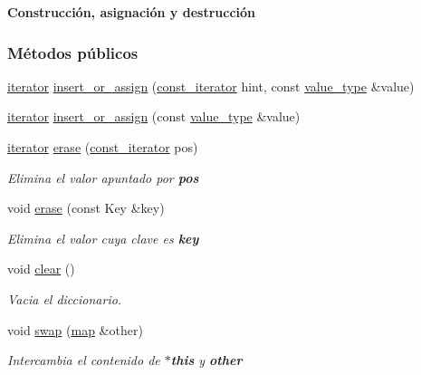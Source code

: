 \begin{Indent}{\bf \-Construcción, asignación y destrucción}
\subsubsection*{Métodos públicos}
\begin{DoxyCompactItemize}
\item 
\hyperlink{classaed2_1_1iterator_1_1iterator}{iterator} \hyperlink{classaed2_1_1iterator_aab34e7001b3ee3ce79da8ea24d7e6351_aab34e7001b3ee3ce79da8ea24d7e6351}{insert\+\_\+or\+\_\+assign} (\hyperlink{classaed2_1_1iterator_1_1const__iterator}{const\+\_\+iterator} hint, const \hyperlink{classaed2_1_1iterator_a6411a2c08b2b7c52f063bef1a168acb6_a6411a2c08b2b7c52f063bef1a168acb6}{value\+\_\+type} \&value)
\item 
\hyperlink{classaed2_1_1iterator_1_1iterator}{iterator} \hyperlink{classaed2_1_1iterator_af131c4b0d89978372a0c8ce38bf8f33e_af131c4b0d89978372a0c8ce38bf8f33e}{insert\+\_\+or\+\_\+assign} (const \hyperlink{classaed2_1_1iterator_a6411a2c08b2b7c52f063bef1a168acb6_a6411a2c08b2b7c52f063bef1a168acb6}{value\+\_\+type} \&value)
\item 
\hyperlink{classaed2_1_1iterator_1_1iterator}{iterator} \hyperlink{classaed2_1_1iterator_adf371aaec9e68bd4a4d5a889d0b6b679_adf371aaec9e68bd4a4d5a889d0b6b679}{erase} (\hyperlink{classaed2_1_1iterator_1_1const__iterator}{const\+\_\+iterator} pos)
\begin{DoxyCompactList}\small\item\em Elimina el valor apuntado por {\bfseries pos} \end{DoxyCompactList}\item 
void \hyperlink{classaed2_1_1iterator_a0a0e62b2a2c0fb98f431164c66a6e388_a0a0e62b2a2c0fb98f431164c66a6e388}{erase} (const Key \&key)
\begin{DoxyCompactList}\small\item\em Elimina el valor cuya clave es {\bfseries key} \end{DoxyCompactList}\item 
void \hyperlink{classaed2_1_1iterator_ac98b533e402839c99d33d3118906c38f_ac98b533e402839c99d33d3118906c38f}{clear} ()
\begin{DoxyCompactList}\small\item\em Vacia el diccionario. \end{DoxyCompactList}\item 
void \hyperlink{classaed2_1_1iterator_a8ec2215b2dfaf6ddd57b1e0b00d8d3d2_a8ec2215b2dfaf6ddd57b1e0b00d8d3d2}{swap} (\hyperlink{classaed2_1_1map}{map} \&other)
\begin{DoxyCompactList}\small\item\em Intercambia el contenido de {\bfseries $\ast$this} y {\bfseries other} \end{DoxyCompactList}\end{DoxyCompactItemize}

\end{Indent}
